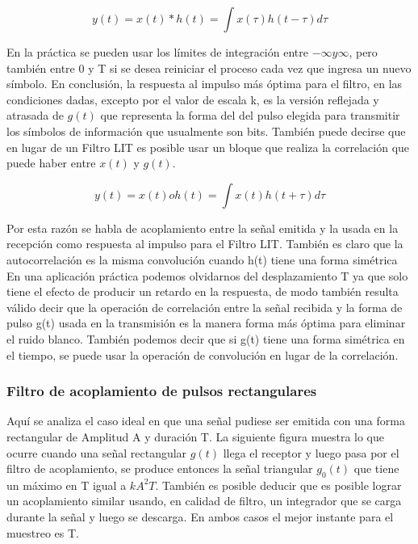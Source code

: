 \begin{equation} \label{capcuatro_veinticinco}
	 y(t) = x(t)*h(t) = \int x(\tau)h(t-\tau)d\tau
\end{equation}

En la práctica se pueden usar los límites de integración entre $ -\infty y \infty$, pero también entre 0 y T si se desea reiniciar el proceso cada vez que ingresa un nuevo símbolo. En conclusión, la respuesta al impulso más óptima para el filtro, en las condiciones dadas, excepto por el valor de escala k, es la versión reflejada y atrasada de $g(t)$ que representa la forma del del pulso elegida para transmitir los símbolos de información que usualmente son bits. También puede decirse que en lugar de un Filtro LIT es posible usar un bloque que realiza la correlación que puede haber entre $x(t)$ y $g(t)$.

\begin{equation} \label{capcuatro_veintiseis}
	y(t) = x(t)oh(t) = \int x(t)h(t+\tau)d\tau
\end{equation}

Por esta razón se habla de acoplamiento entre la señal emitida y la usada en la recepción como respuesta al impulso para el Filtro LIT. También es claro que la autocorrelación es la misma convolución cuando h(t) tiene una forma simétrica \\

En una aplicación práctica podemos olvidarnos del desplazamiento T ya que solo tiene el efecto de producir un retardo en la respuesta, de modo también resulta válido decir que la operación de correlación entre la señal recibida y la forma de pulso g(t) usada en la transmisión es la manera forma más óptima para eliminar el ruido blanco. También podemos decir que si g(t) tiene una forma simétrica en el tiempo, se puede usar la operación de convolución en lugar de la correlación. \\

\subsubsection{Filtro de acoplamiento de pulsos rectangulares}

Aquí se analiza el caso ideal en que una señal pudiese ser emitida con una forma rectangular de Amplitud A y duración T. La siguiente figura muestra lo que ocurre cuando una señal rectangular $g(t)$ llega el receptor y luego pasa por el filtro de acoplamiento, se produce entonces la señal triangular $ g_0(t) $ que tiene un máximo en T  igual a $kA^{2}T$. También es posible deducir que es posible lograr un acoplamiento similar usando, en calidad de filtro, un integrador que se carga durante la señal y luego se descarga. En ambos casos el mejor instante para el muestreo es T. \\


